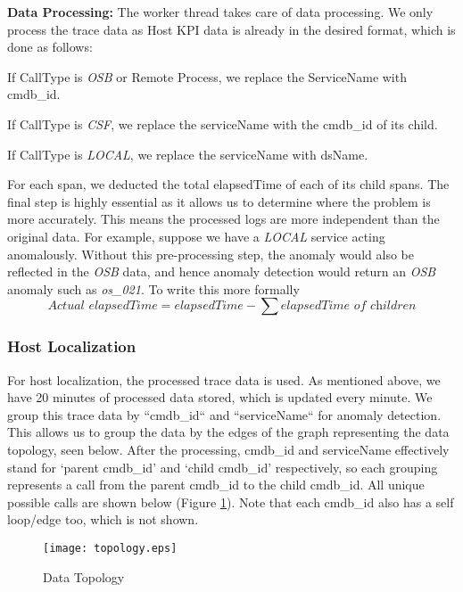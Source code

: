 \documentclass[12pt]{article}
\let\tempone\itemize
\let\temptwo\enditemize
\renewenvironment{itemize}{\tempone\setlength{\itemsep}{0pt}}{\temptwo}
\begin{document}
\smallskip
\noindent \textbf{Data Processing:} The worker thread takes care of data processing. We only process the trace data as Host KPI data is already in the desired format, which is done as follows:
\begin{itemize}
    \item If CallType is \textit{OSB} or Remote Process, we replace the ServiceName with cmdb\_id.
    \item If CallType is \textit{CSF}, we replace the serviceName with the cmdb\_id of its child.
    \item If CallType is \textit{LOCAL}, we replace the serviceName with dsName.
    \item For each span, we deducted the total elapsedTime of each of its child spans. 
\end{itemize}
The final step is highly essential as it allows us to determine where the problem is more accurately. This means the processed logs are more independent than the original data. For example, suppose we have a \textit{LOCAL} service acting anomalously. Without this pre-processing step, the anomaly would also be reflected in the \textit{OSB} data, and hence anomaly detection would return an \textit{OSB} anomaly such as \textit{os\_021}. To write this more formally
\[
    \textit{Actual elapsedTime}=  elapsedTime - \sum \textit{elapsedTime of children}
\]
\subsubsection{Host Localization}
For host localization, the processed trace data is used. As mentioned above, we have 20 minutes of processed data stored, which is updated every minute. We group this trace data by ``cmdb\_id`` and ``serviceName`` for anomaly detection. This allows us to group the data by the edges of the graph representing the data topology, seen below. After the processing, cmdb\_id and serviceName effectively stand for `parent cmdb\_id' and `child cmdb\_id' respectively, so each grouping represents a call from the parent cmdb\_id to the child cmdb\_id. All unique possible calls are shown below (Figure \ref{fig:Topology}). Note that each cmdb\_id also has a self loop/edge too, which is not shown.
\begin{figure}[H]
    \centering
    \texttt{[image: topology.eps]}
    \caption{Data Topology}
    \label{fig:Topology}
\end{figure}
\end{document}
